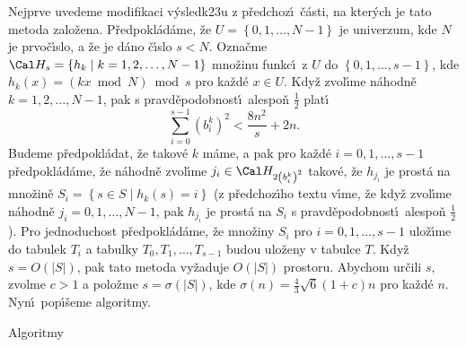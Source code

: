 \flushpar Nejprve uvedeme modifikaci v\'ysledk\accent23u z 
p\v redchoz\'\i\ \v c\'asti, na kter\'ych je tato metoda zalo\v zena.
P\v redpokl\'ad\'ame, \v ze $U=\left\{0,1,\dots,N-1\right\}$ je univerzum, kde $
N$ je 
prvo\v c\'\i slo, a \v ze je d\'ano \v c\'\i slo $s<N$. Ozna\v cme 
$\Cal H_s=\left\{h_k\mid k=1,2,\dots,N-1\right\}$ mno\v zinu funkc\'\i\ z $U$ do 
$\left\{0,1,\dots,s-1\right\}$, kde $h_k\left(x\right)=\left(kx\bmod N\right)\bmod s$ pro ka\v zd\'e $
x\in U$. 
Kdy\v z zvol\'\i me n\'ahodn\v e $k=1,2,\dots,N-1$, pak s pravd\v epodobnost\'\i\ 
ales\-po\v n $\frac 12$ plat\'\i\ 
$$\sum_{i=0}^{s-1}\left(b_i^k\right)^2<\frac {8n^2}s+2n.$$
Budeme p\v redpokl\'adat, 
\v ze takov\'e $k$ m\'ame, a pak pro ka\v zd\'e $i=0,1,\dots,s-1$ 
p\v redpokl\'ad\'ame, \v ze n\'ahodn\v e zvol\'\i me $j_i\in \Cal H_{
2\left(b_i^k\right)^2}$ takov\'e, \v ze 
$h_{j_i}$ je prost\'a na mno\v zin\v e $S_i=\left\{s\in S\mid h_k\left(s\right)=i
\right\}$ (z p\v redchoz\'\i ho textu v\'\i me, \v ze kdy\v z zvol\'\i me n\'ahodn\v e 
$j_i=0,1,\dots,N-1$, pak $h_{j_i}$ je prost\'a na $S_i$ s pravd\v epodobnost\'\i\ ales\-po\v n $\frac 
12$). Pro jednoduchost p\v redpokl\'ad\'ame, \v ze mno\v ziny $
S_i$ 
pro $i=0,1,\dots,s-1$ ulo\v z\'\i me do tabulek $T_i$ a tabulky 
$T_0,T_1,\dots,T_{s-1}$ budou ulo\v zeny v tabulce $T$. Kdy\v z $
s=O\left(|S|\right)$, 
pak tato metoda vy\v zaduje $O\left(|S|\right)$ prostoru. Abychom ur\v cili $
s$, 
zvolme $c>1$ a polo\v zme $s=\sigma \left(|S|\right)$, kde $\sigma \left(n\right)=\frac 
43\sqrt 6\left(1+c\right)n$ pro 
ka\v zd\'e $n$. Nyn\'\i\ pop\'\i\v seme algoritmy. 
\medskip

\subhead
Algoritmy
\endsubhead
\smallskip

